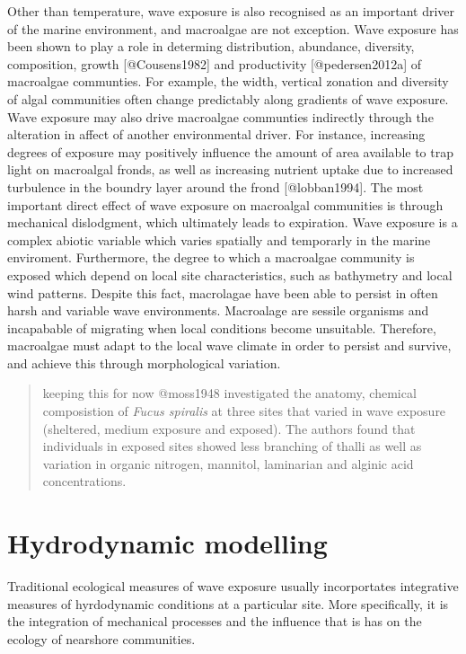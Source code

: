 \documentclass[]{article}
\begin{document}
Other than temperature, wave exposure is also recognised as an important
driver of the marine environment, and macroalgae are not exception. Wave
exposure has been shown to play a role in determing distribution,
abundance, diversity, composition, growth {[}@Cousens1982{]} and
productivity {[}@pedersen2012a{]} of macroalgae communties. For example,
the width, vertical zonation and diversity of algal communities often
change predictably along gradients of wave exposure. Wave exposure may
also drive macroalgae communties indirectly through the alteration in
affect of another environmental driver. For instance, increasing degrees
of exposure may positively influence the amount of area available to
trap light on macroalgal fronds, as well as increasing nutrient uptake
due to increased turbulence in the boundry layer around the frond
{[}@lobban1994{]}. The most important direct effect of wave exposure on
macroalgal communities is through mechanical dislodgment, which
ultimately leads to expiration. Wave exposure is a complex abiotic
variable which varies spatially and temporarly in the marine enviroment.
Furthermore, the degree to which a macroalgae community is exposed which
depend on local site characteristics, such as bathymetry and local wind
patterns. Despite this fact, macrolagae have been able to persist in
often harsh and variable wave environments. Macroalage are sessile
organisms and incapabable of migrating when local conditions become
unsuitable. Therefore, macroalgae must adapt to the local wave climate
in order to persist and survive, and achieve this through morphological
variation.

\begin{quote}
keeping this for now @moss1948 investigated the anatomy, chemical
composistion of \emph{Fucus spiralis} at three sites that varied in wave
exposure (sheltered, medium exposure and exposed). The authors found
that individuals in exposed sites showed less branching of thalli as
well as variation in organic nitrogen, mannitol, laminarian and alginic
acid concentrations.
\end{quote}

\section{Hydrodynamic modelling}\label{hydrodynamic-modelling}

Traditional ecological measures of wave exposure usually incorportates
integrative measures of hyrdodynamic conditions at a particular site.
More specifically, it is the integration of mechanical processes and the
influence that is has on the ecology of nearshore communities.
\end{document}
